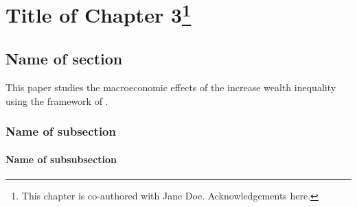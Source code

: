 \graphicspath{{4_chapter/figures/}}

\renewcommand*{\thefootnote}{\fnsymbol{footnote}}
\chapter[Title of Chapter 3]{Title of Chapter 3\footnote{\noindent
This chapter is co-authored with Jane Doe. Acknowledgements here.}}
\label{chapter:chapter3-alias}
\newpage

\setcounter{footnote}{0}
\renewcommand*{\thefootnote}{\arabic{footnote}}

\section{\label{}Name of section}

This paper studies the macroeconomic effects of the increase wealth inequality using the framework of \citet{krusell1998income}. \lipsum[1-2]




\lipsum[3-4]

\subsection{\label{}Name of subsection}

\lipsum[5-6]



\lipsum[7-8]

\subsubsection{\label{}Name of subsubsection}

\lipsum[9-10]

\newpage{}
\printbibliography[segment=0,heading=subbibintoc]

\newpage{}
\begin{subappendices}
\newrefsegment %

\end{subappendices}
